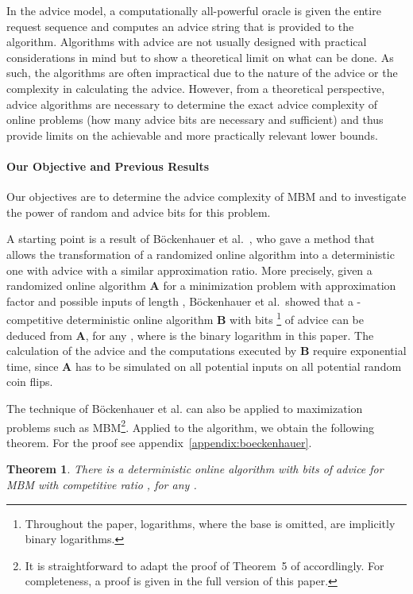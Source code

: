 \documentclass[a4paper]{article}
\newtheorem{theorem}{Theorem}
\begin{document}
In the advice model, a computationally all-powerful oracle is given the entire request sequence and
computes an advice string that is provided to the algorithm.
Algorithms with advice are not usually designed with practical considerations in mind but to show a
theoretical limit on what can be done. As such, the algorithms are often impractical due to the nature of
the advice or the complexity in calculating the advice.
However, from a theoretical perspective, advice algorithms are necessary to determine the exact advice
complexity of online problems (how many advice bits are necessary and sufficient) and thus provide limits on
the achievable and more practically relevant lower bounds.





\paragraph*{Our Objective and Previous Results} Our objectives are to determine the advice complexity
of \textsc{MBM} and to investigate the power of random and advice bits for this problem.

A starting point is a result of B\"{o}ckenhauer et al.~\cite{bkkk11}, who gave a method that allows the
transformation of a randomized online algorithm into a deterministic one with advice with a similar
approximation ratio. More precisely, given a randomized online algorithm \textbf{A} for a minimization problem
 with approximation factor  and possible inputs  of length ,
B\"{o}ckenhauer et al.\ showed that a -competitive deterministic online algorithm \textbf{B}
with 
bits
\footnote{Throughout the paper, logarithms, where the base is omitted, are implicitly binary logarithms.}
of advice can be deduced from \textbf{A}, for any ,
where  is the binary logarithm in this paper.
The calculation of the advice and the computations executed by \textbf{B} require exponential time, since
\textbf{A} has to be simulated on all potential inputs  on all potential
random coin flips.

The technique of Böckenhauer et al. \cite{bkkk11} can also be applied to maximization problems such as \textsc{MBM}\footnote{It is
straightforward to adapt the proof of Theorem~5 of \cite{bkkk11} accordlingly. For completeness, a proof is given in the full
version of this paper.}.
Applied to the  algorithm, we obtain the following theorem.  For the proof see appendix~\ref{appendix:boeckenhauer}.

\begin{theorem} \label{thm:bockenhauer}
 There is a deterministic online algorithm with  bits
 of advice for \textsc{MBM} with competitive ratio , for any .
\end{theorem}
\end{document}

